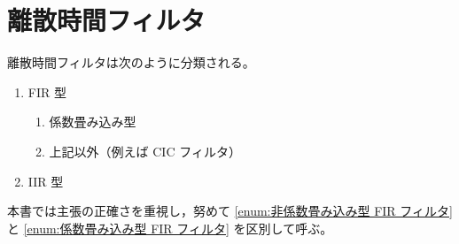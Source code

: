 \chapter{離散時間フィルタ}
    離散時間フィルタは次のように分類される。
    \begin{enumerate}
        \item FIR 型
        \begin{enumerate}
            \item 係数畳み込み型 \label{enum:係数畳み込み型 FIR フィルタ}
            \item 上記以外（例えば CIC フィルタ） \label{enum:非係数畳み込み型 FIR フィルタ}
        \end{enumerate}
        \item IIR 型
    \end{enumerate}
    本書では主張の正確さを重視し，努めて \ref{enum:非係数畳み込み型 FIR フィルタ} と \ref{enum:係数畳み込み型 FIR フィルタ} を区別して呼ぶ。
    
    
    
